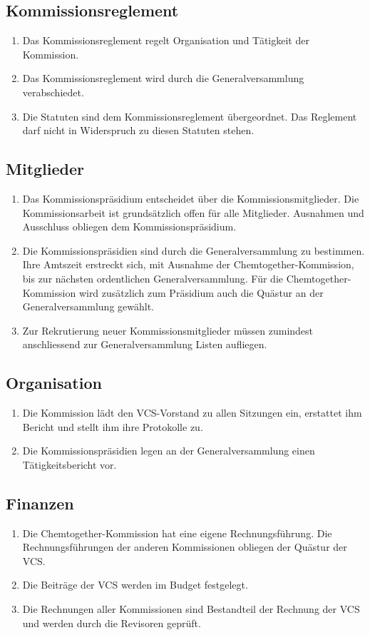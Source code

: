 \subsection{Kommissionsreglement}
\begin{enumerate}
\item Das Kommissionsreglement regelt Organisation und Tätigkeit der Kommission.
\item Das Kommissionsreglement wird durch die Generalversammlung verabschiedet.
\item Die Statuten sind dem Kommissionsreglement übergeordnet. Das Reglement darf nicht in Widerspruch zu diesen Statuten stehen.
\end{enumerate}

\subsection{Mitglieder}
\begin{enumerate}
\item Das Kommissionspräsidium entscheidet über die Kommissionsmitglieder. Die Kommissionsarbeit ist grundsätzlich offen für alle Mitglieder. Ausnahmen und Ausschluss obliegen dem Kommissionspräsidium.
\item Die Kommissionspräsidien sind durch die Generalversammlung zu bestimmen. Ihre Amtszeit erstreckt sich, mit Ausnahme der Chemtogether-Kommission, bis zur nächsten ordentlichen Generalversammlung. Für die Chemtogether-Kommission wird zusätzlich zum Präsidium auch die Quästur an der Generalversammlung gewählt.
\item Zur Rekrutierung neuer Kommissionsmitglieder müssen zumindest anschliessend zur Generalversammlung Listen aufliegen.
\end{enumerate}

\subsection{Organisation}
\begin{enumerate}
\item Die Kommission lädt den VCS-Vorstand zu allen Sitzungen ein, erstattet ihm Bericht und stellt ihm ihre Protokolle zu.
\item Die Kommissionspräsidien legen an der Generalversammlung einen Tätigkeitsbericht vor.
\end{enumerate}


\subsection{Finanzen}
\begin{enumerate}
\item Die Chemtogether-Kommission hat eine eigene Rechnungsführung. Die Rechnungsführungen der anderen Kommissionen obliegen der Quästur der VCS.
\item Die Beiträge der VCS werden im Budget festgelegt.
\item Die Rechnungen aller Kommissionen sind Bestandteil der Rechnung der VCS und werden durch die Revisoren geprüft.
\end{enumerate}

